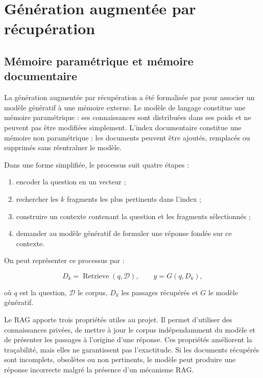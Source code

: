 \section{Génération augmentée par récupération}

\subsection{Mémoire paramétrique et mémoire documentaire}

La génération augmentée par récupération a été formalisée par \citet{Lewis2020} pour associer un modèle génératif à une mémoire externe. Le modèle de langage constitue une mémoire paramétrique : ses connaissances sont distribuées dans ses poids et ne peuvent pas être modifiées simplement. L'index documentaire constitue une mémoire non paramétrique : les documents peuvent être ajoutés, remplacés ou supprimés sans réentraîner le modèle.

Dans une forme simplifiée, le processus suit quatre étapes :

\begin{enumerate}
    \item encoder la question en un vecteur ;
    \item rechercher les $k$ fragments les plus pertinents dans l'index ;
    \item construire un contexte contenant la question et les fragments sélectionnés ;
    \item demander au modèle génératif de formuler une réponse fondée sur ce contexte.
\end{enumerate}

On peut représenter ce processus par :

\begin{equation}
D_k=\operatorname{Retrieve}(q,\mathcal{D}), \qquad y=G(q,D_k),
\end{equation}

où $q$ est la question, $\mathcal{D}$ le corpus, $D_k$ les passages récupérés et $G$ le modèle génératif.

Le RAG apporte trois propriétés utiles au projet. Il permet d'utiliser des connaissances privées, de mettre à jour le corpus indépendamment du modèle et de présenter les passages à l'origine d'une réponse. Ces propriétés améliorent la traçabilité, mais elles ne garantissent pas l'exactitude. Si les documents récupérés sont incomplets, obsolètes ou non pertinents, le modèle peut produire une réponse incorrecte malgré la présence d'un mécanisme RAG.

